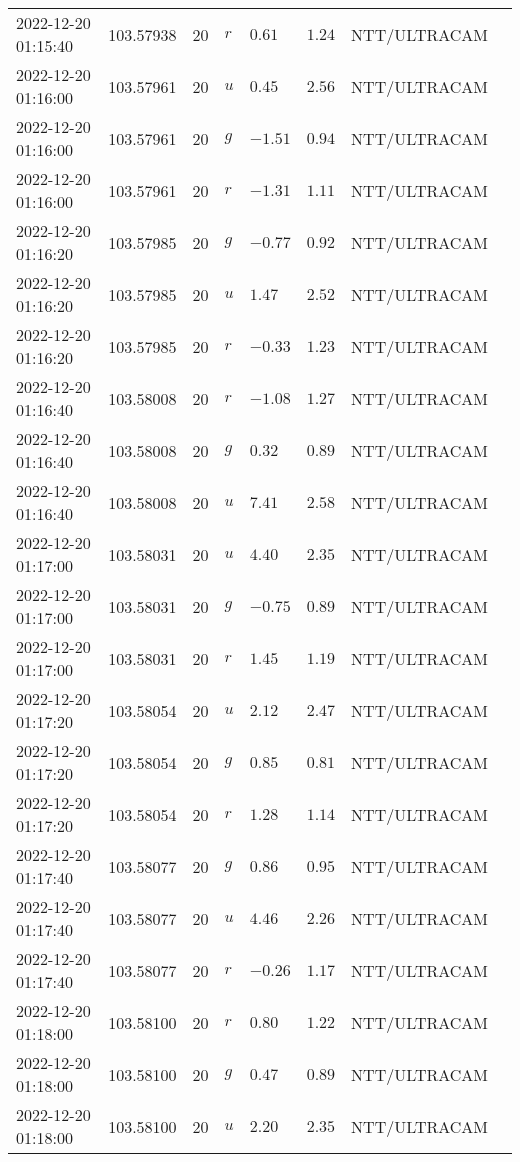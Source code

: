 \documentclass{nature_plusfigure}
\begin{document}
\begin{supplement}
\begin{center}
\begin{longtable}{llllllll}
2022-12-20 01:15:40 & 103.57938 & 20 & $r$ & $0.61$ & $1.24$ & NTT/ULTRACAM &  \\ 
2022-12-20 01:16:00 & 103.57961 & 20 & $u$ & $0.45$ & $2.56$ & NTT/ULTRACAM &  \\ 
2022-12-20 01:16:00 & 103.57961 & 20 & $g$ & $-1.51$ & $0.94$ & NTT/ULTRACAM &  \\ 
2022-12-20 01:16:00 & 103.57961 & 20 & $r$ & $-1.31$ & $1.11$ & NTT/ULTRACAM &  \\ 
2022-12-20 01:16:20 & 103.57985 & 20 & $g$ & $-0.77$ & $0.92$ & NTT/ULTRACAM &  \\ 
2022-12-20 01:16:20 & 103.57985 & 20 & $u$ & $1.47$ & $2.52$ & NTT/ULTRACAM &  \\ 
2022-12-20 01:16:20 & 103.57985 & 20 & $r$ & $-0.33$ & $1.23$ & NTT/ULTRACAM &  \\ 
2022-12-20 01:16:40 & 103.58008 & 20 & $r$ & $-1.08$ & $1.27$ & NTT/ULTRACAM &  \\ 
2022-12-20 01:16:40 & 103.58008 & 20 & $g$ & $0.32$ & $0.89$ & NTT/ULTRACAM &  \\ 
2022-12-20 01:16:40 & 103.58008 & 20 & $u$ & $7.41$ & $2.58$ & NTT/ULTRACAM &  \\ 
2022-12-20 01:17:00 & 103.58031 & 20 & $u$ & $4.40$ & $2.35$ & NTT/ULTRACAM &  \\ 
2022-12-20 01:17:00 & 103.58031 & 20 & $g$ & $-0.75$ & $0.89$ & NTT/ULTRACAM &  \\ 
2022-12-20 01:17:00 & 103.58031 & 20 & $r$ & $1.45$ & $1.19$ & NTT/ULTRACAM &  \\ 
2022-12-20 01:17:20 & 103.58054 & 20 & $u$ & $2.12$ & $2.47$ & NTT/ULTRACAM &  \\ 
2022-12-20 01:17:20 & 103.58054 & 20 & $g$ & $0.85$ & $0.81$ & NTT/ULTRACAM &  \\ 
2022-12-20 01:17:20 & 103.58054 & 20 & $r$ & $1.28$ & $1.14$ & NTT/ULTRACAM &  \\ 
2022-12-20 01:17:40 & 103.58077 & 20 & $g$ & $0.86$ & $0.95$ & NTT/ULTRACAM &  \\ 
2022-12-20 01:17:40 & 103.58077 & 20 & $u$ & $4.46$ & $2.26$ & NTT/ULTRACAM &  \\ 
2022-12-20 01:17:40 & 103.58077 & 20 & $r$ & $-0.26$ & $1.17$ & NTT/ULTRACAM &  \\ 
2022-12-20 01:18:00 & 103.58100 & 20 & $r$ & $0.80$ & $1.22$ & NTT/ULTRACAM &  \\ 
2022-12-20 01:18:00 & 103.58100 & 20 & $g$ & $0.47$ & $0.89$ & NTT/ULTRACAM &  \\ 
2022-12-20 01:18:00 & 103.58100 & 20 & $u$ & $2.20$ & $2.35$ & NTT/ULTRACAM &  \\ 

\end{longtable}
\end{center}
\end{supplement}
\end{document}
